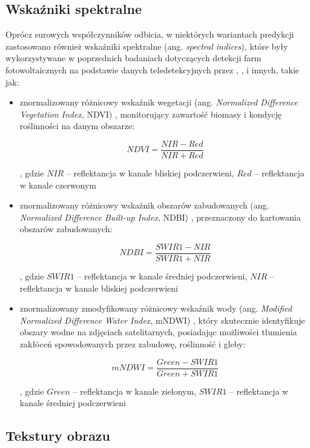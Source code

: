 \documentclass{amuthesis}
\begin{document}
\hypertarget{sec-spectral-indices}{%
\subsection{Wskaźniki spektralne}\label{sec-spectral-indices}}

Oprócz surowych współczynników odbicia, w niektórych wariantach
predykcji zastosowano również wskaźniki spektralne (ang. \emph{spectral
indices}), które były wykorzystywane w poprzednich badaniach dotyczących
detekcji farm fotowoltaicznych na podstawie danych teledetekcyjnych
przez \textcite{zhang_2021_texture}, \textcite{plakman_2022_pv},
\textcite{wang_2022_pv} i innych, takie jak:

\begin{itemize}
\item
  znormalizowany różnicowy wskaźnik wegetacji (ang. \emph{Normalized
  Difference Vegetation Index}, NDVI) \autocite{ndvi}, monitorujący
  zawartość biomasy i kondycję roślinności na danym obszarze:

  \[
  NDVI = \frac{NIR - Red}{NIR + Red}
  \]

  , gdzie \(NIR\) -- reflektancja w kanale bliskiej podczerwieni,
  \(Red\) -- reflektancja w kanale czerwonym
\item
  znormalizowany różnicowy wskaźnik obszarów zabudowanych (ang.
  \emph{Normalized Difference Built-up Index}, NDBI) \autocite{ndbi},
  przeznaczony do kartowania obszarów zabudowanych:

  \[
  NDBI = \frac{SWIR1 - NIR}{SWIR1 + NIR}
  \]

  , gdzie \(SWIR1\) -- reflektancja w kanale średniej podczerwieni,
  \(NIR\) -- reflektancja w kanale bliskiej podczerwieni
\item
  znormalizowany zmodyfikowany różnicowy wskaźnik wody (ang.
  \emph{Modified Normalized Difference Water Index}, mNDWI)
  \autocite{mndwi}, który skutecznie identyfikuje obszary wodne na
  zdjęciach satelitarnych, posiadając możliwości tłumienia zakłóceń
  spowodowanych przez zabudowę, roślinność i gleby:

  \[
  mNDWI = \frac{Green - SWIR1}{Green + SWIR1}
  \]

  , gdzie \(Green\) -- reflektancja w kanale zielonym, \(SWIR1\) --
  reflektancja w kanale średniej podczerwieni
\end{itemize}

\hypertarget{sec-textures}{%
\subsection{Tekstury obrazu}\label{sec-textures}}
\end{document}
